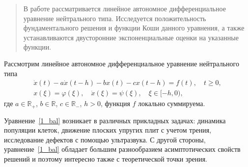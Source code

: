 
\maketitle

\begin{abstract}
В работе рассматривается линейное автономное дифференциальное уравнение нейтрального типа. Исследуется положительность фундаментального решения и функции Коши данного уравнения, а также устанавливаются двусторонние экспоненциальные оценки на указанные функции.


\end{abstract}


Рассмотрим линейное автономное дифференциальное уравнение нейтрального типа
\begin{equation}
\label{1_bal}
\begin{aligned}
\dot x(t)-a\dot x(t-h)-bx(t)-cx(t-h)=f(t),\quad t\ge0,\\
x(\xi)=\varphi(\xi),\quad\dot x(\xi)=\psi(\xi),\quad\xi\in[-h,0),
\end{aligned}
\end{equation}
где $a\in\mathbb R_+$, $b\in\mathbb R$, $c\in\mathbb R_-$, $h>0$, функция $f$ локально суммируема.

Уравнение~\eqref{1_bal} возникает в различных прикладных задачах: динамика популяции клеток, движение плоских упругих плит с учетом трения, исследование дефектов с помощью ультразвука.
С другой стороны, уравнение~\eqref{1_bal} обладает большим разнообразием асимптотических свойств решений и поэтому интересно также с теоретической точки зрения.

